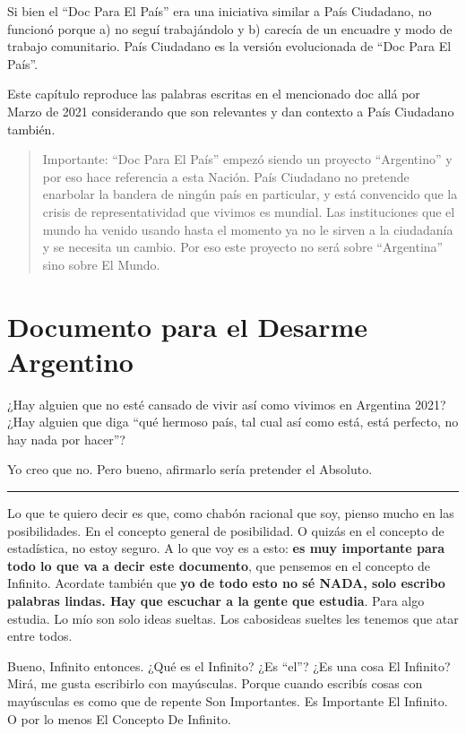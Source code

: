 \documentclass[
]{book}
\begin{document}
Si bien el ``Doc Para El País'' era una iniciativa similar a País Ciudadano, no funcionó porque a) no seguí trabajándolo y b) carecía de un encuadre y modo de trabajo comunitario. País Ciudadano es la versión evolucionada de ``Doc Para El País''.

Este capítulo reproduce las palabras escritas en el mencionado doc allá por Marzo de 2021 considerando que son relevantes y dan contexto a País Ciudadano también.

\begin{quote}
Importante: ``Doc Para El País'' empezó siendo un proyecto ``Argentino'' y por eso hace referencia a esta Nación. País Ciudadano no pretende enarbolar la bandera de ningún país en particular, y está convencido que la crisis de representatividad que vivimos es mundial. Las instituciones que el mundo ha venido usando hasta el momento ya no le sirven a la ciudadanía y se necesita un cambio. Por eso este proyecto no será sobre ``Argentina'' sino sobre El Mundo.
\end{quote}

\hypertarget{documento-para-el-desarme-argentino}{%
\section{Documento para el Desarme Argentino}\label{documento-para-el-desarme-argentino}}

¿Hay alguien que no esté cansado de vivir así como vivimos en Argentina 2021? ¿Hay alguien que diga ``qué hermoso país, tal cual así como está, está perfecto, no hay nada por hacer''?

Yo creo que no. Pero bueno, afirmarlo sería pretender el Absoluto.

\begin{center}\rule{0.5\linewidth}{0.5pt}\end{center}

Lo que te quiero decir es que, como chabón racional que soy, pienso mucho en las posibilidades. En el concepto general de posibilidad. O quizás en el concepto de estadística, no estoy seguro. A lo que voy es a esto: \textbf{es muy importante para todo lo que va a decir este documento}, que pensemos en el concepto de Infinito. Acordate también que \textbf{yo de todo esto no sé NADA, solo escribo palabras lindas. Hay que escuchar a la gente que estudia}. Para algo estudia. Lo mío son solo ideas sueltas. Los cabosideas sueltes les tenemos que atar entre todos.

Bueno, Infinito entonces. ¿Qué es el Infinito? ¿Es ``el''? ¿Es una cosa El Infinito? Mirá, me gusta escribirlo con mayúsculas. Porque cuando escribís cosas con mayúsculas es como que de repente Son Importantes. Es Importante El Infinito. O por lo menos El Concepto De Infinito.
\end{document}
